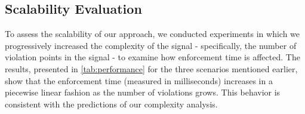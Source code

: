 \subsection{Scalability Evaluation}\label{sec:scala}
    To assess the scalability of our approach, we conducted experiments in which we progressively increased the complexity of the signal - specifically, the number of violation points in the signal - to examine how enforcement time is affected. The results, presented in \cref{tab:performance} for the three scenarios mentioned earlier, show that the enforcement time (measured in milliseconds) increases in a piecewise linear fashion as the number of violations grows. This behavior is consistent with the predictions of our complexity analysis.
